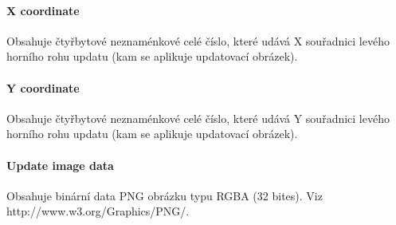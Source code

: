 \documentclass[12pt,oneside,a4paper]{report}
\begin{document}
\paragraph{X coordinate}
Obsahuje čtyřbytové neznaménkové celé číslo, které udává X souřadnici levého horního rohu updatu (kam se aplikuje updatovací obrázek).

\paragraph{Y coordinate}
Obsahuje čtyřbytové neznaménkové celé číslo, které udává Y souřadnici levého horního rohu updatu (kam se aplikuje updatovací obrázek).

\paragraph{Update image data}
Obsahuje binární data PNG obrázku typu RGBA (32 bites). Viz http://www.w3.org/Graphics/PNG/. 
\end{document}
